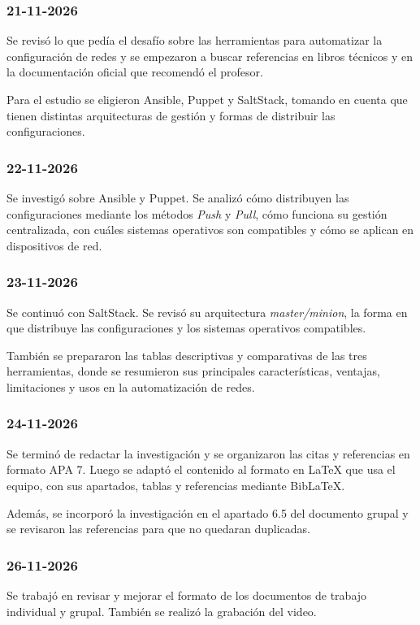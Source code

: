 \documentclass[12pt,a4paper]{article}
\begin{document}
\subsubsection{21-11-2026}

Se revisó lo que pedía el desafío sobre las herramientas para
automatizar la configuración de redes y se empezaron a buscar
referencias en libros técnicos y en la documentación oficial
que recomendó el profesor.

Para el estudio se eligieron Ansible, Puppet y SaltStack,
tomando en cuenta que tienen distintas arquitecturas de
gestión y formas de distribuir las configuraciones.

\subsubsection{22-11-2026}

Se investigó sobre Ansible y Puppet. Se analizó cómo
distribuyen las configuraciones mediante los métodos
\textit{Push} y \textit{Pull}, cómo funciona su gestión
centralizada, con cuáles sistemas operativos son compatibles
y cómo se aplican en dispositivos de red.

\subsubsection{23-11-2026}

Se continuó con SaltStack. Se revisó su arquitectura
\textit{master/minion}, la forma en que distribuye las
configuraciones y los sistemas operativos compatibles.

También se prepararon las tablas descriptivas y comparativas
de las tres herramientas, donde se resumieron sus principales
características, ventajas, limitaciones y usos en la
automatización de redes.

\subsubsection{24-11-2026}

Se terminó de redactar la investigación y se organizaron las
citas y referencias en formato APA 7. Luego se adaptó el
contenido al formato en LaTeX que usa el equipo, con sus
apartados, tablas y referencias mediante BibLaTeX.

Además, se incorporó la investigación en el apartado 6.5 del
documento grupal y se revisaron las referencias para que no
quedaran duplicadas.

\subsubsection{26-11-2026}

Se trabajó en revisar y mejorar el formato de los documentos
de trabajo individual y grupal. También se realizó la
grabación del video.
\par
\end{document}

